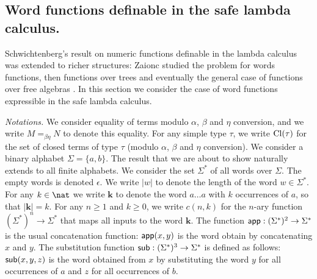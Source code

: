 \newcommand{\openedof}[2]{{\rm Op}(#1,#2)} %

\newcommand\wordnum[1]{\mathbf{#1}} %
\newcommand\safedefset{$\lambda^{safe}${\rm def}}

\newcommand\fatlambda{\lambda\kern-0.7em\lambda}
\newcommand\wordapp{{\sf app}}
\newcommand\wordsub{{\sf sub}}


\subsection{Word functions definable in the safe lambda calculus.}
Schwichtenberg's result on numeric functions definable in the lambda
calculus was extended to richer structures: Zaionc studied the
problem for words functions, then functions over trees and
eventually the general case of functions over free algebras
\cite{DBLP:journals/tcs/Leivant93,DBLP:journals/apal/Zaionc91,DBLP:conf/aluacs/Zaionc88,DBLP:journals/tcs/Zaionc87,
zaionc:csl94}. In this section we consider the case of word
functions expressible in the safe lambda calculus.
\smallskip

\emph{Notations.} We consider equality of terms modulo $\alpha$,
$\beta$ and $\eta$ conversion, and we write $M=_{\beta\eta} N$ to
denote this equality. For any simple type $\tau$, we write
${\rm Cl}(\tau)$ for the set of closed terms of type $\tau$ (modulo
$\alpha$, $\beta$ and $\eta$ conversion). We consider a binary
alphabet $\Sigma = \{a,b\}$. The result that we are about to show naturally extends to all
finite alphabets. We consider the set $\Sigma^*$ of all words over
$\Sigma$. The empty words is denoted $\epsilon$. We write $|w|$ to
denote the length of the word $w\in\Sigma^*$. For any $k\in \nat$ we
write $\wordnum{k}$ to denote the word $a \ldots a$ with $k$
occurrences of $a$, so that $|\wordnum{k}| = k$. For any $n\geq 1$
and $k\geq 0$, we write $c(n,k)$ for the $n$-ary function
$(\Sigma^*)^n \rightarrow \Sigma^*$ that maps all inputs to the word
$\wordnum{k}$. The function $\wordapp : (\Sigma^*)^2 \rightarrow
\Sigma^*$ is the usual concatenation function: $\wordapp(x,y)$ is
the word obtain by concatenating $x$ and $y$. The substitution
function $\wordsub : (\Sigma^*)^3 \rightarrow \Sigma^*$ is defined
as follows: $\wordsub(x,y,z)$ is the word obtained from $x$ by
substituting the word $y$ for all occurrences of $a$ and $z$ for all
occurrences of $b$.

